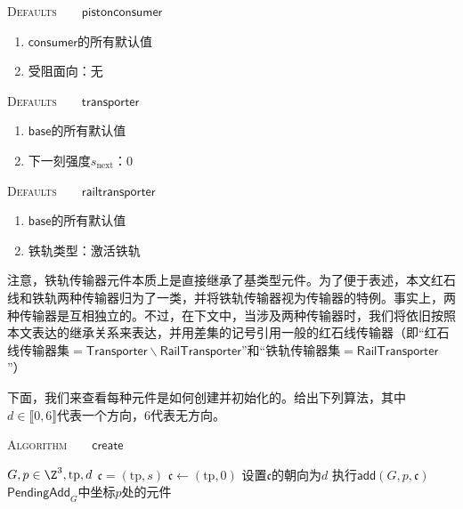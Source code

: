 \documentclass[a4,11pt]{aleph-notas}
\begin{document}
\begin{codigo}
\textsc{Defaults}\ \ \ \ $\mathsf{pistonconsumer}$
\begin{enumerate}
  \setlength{\itemsep}{1pt}
  \setlength{\parskip}{0pt}
  \setlength{\parsep}{0pt}
    \item $\mathsf{consumer}$的所有默认值
    \item 受阻面向：无
\end{enumerate}
\end{codigo}

\begin{codigo}
\textsc{Defaults}\ \ \ \ $\mathsf{transporter}$
\begin{enumerate}
  \setlength{\itemsep}{1pt}
  \setlength{\parskip}{0pt}
  \setlength{\parsep}{0pt}
    \item $\mathsf{base}$的所有默认值
    \item 下一刻强度$s_{\mathrm{next}}$：$0$
\end{enumerate}
\end{codigo}

\begin{codigo}
\textsc{Defaults}\ \ \ \ $\mathsf{railtransporter}$
\begin{enumerate}
  \setlength{\itemsep}{1pt}
  \setlength{\parskip}{0pt}
  \setlength{\parsep}{0pt}
    \item $\mathsf{base}$的所有默认值
    \item 铁轨类型：激活铁轨
\end{enumerate}
\end{codigo}

\begin{warning}
    注意，铁轨传输器元件本质上是直接继承了基类型元件。为了便于表述，本文红石线和铁轨两种传输器归为了一类，并将铁轨传输器视为传输器的特例。事实上，两种传输器是互相独立的。不过，在下文中，当涉及两种传输器时，我们将依旧按照本文表达的继承关系来表达，并用差集的记号引用一般的红石线传输器（即“红石线传输器集$=\mathsf{Transporter}\backslash\mathsf{RailTransporter}$”和“铁轨传输器集$\mathsf{=RailTransporter}$”）
\end{warning}

下面，我们来查看每种元件是如何创建并初始化的。给出下列算法，其中$d\in\llbracket0,6\rrbracket$代表一个方向，$6$代表无方向。

\begin{codigo}
\textsc{Algorithm}\ \ \ \ $\mathsf{create}$
\begin{algorithmic}[1]
    \Require $G,p\in\Z^3,\mathrm{tp},d$
    \Ensure $\mathfrak{c}=(\mathrm{tp},s)$
    \State $\mathfrak{c}\gets(\mathrm{tp},0)$
    \State 设置$\mathfrak{c}$的朝向为$d$
    \State 执行$\mathsf{add}(G,p,\mathfrak{c})$
    \State \Return $\textsf{PendingAdd}_G$中坐标$p$处的元件
\end{algorithmic}
\end{codigo}
\end{document}
